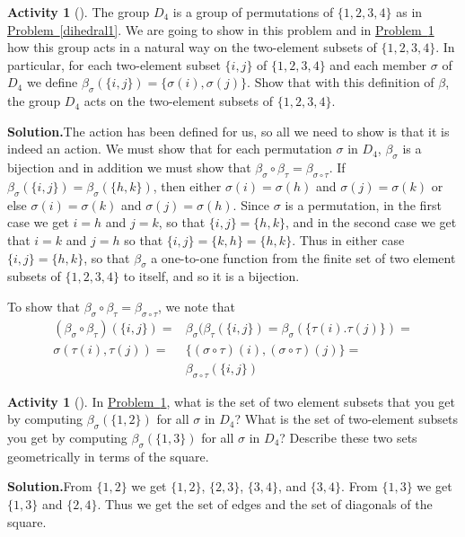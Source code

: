 \documentclass[10pt,]{book}
\theoremstyle{plain}
\theoremstyle{definition}
\newtheorem{activity}[project]{Activity}
\numberwithin{equation}{chapter}
\newcommand{\amp}{&}
\begin{document}
\begin{activity}[]\label{D_4on2-sets}
The group \(D_4\) is a group of permutations of \(\{1,2,3,4\}\) as in \hyperref[dihedral1]{Problem~\ref{dihedral1}}. We are going to show in this problem and in \hyperref[orbits1]{Problem~\ref{orbits1}} how this group acts in a natural way on the two-element subsets of \(\{1,2,3,4\}\). In particular, for each two-element subset \(\{i,j\}\) of \(\{1,2,3,4\}\) and each member \(\sigma\) of \(D_4\) we define \(\beta_{\sigma}(\{i,j\}) = \{\sigma(i),\sigma(j)\}\). Show that with this definition of \(\beta\), the group \(D_4\) acts on the two-element subsets of \(\{1,2,3,4\}\).%
\par\medskip\noindent%
\textbf{Solution.}\quad The action has been defined for us, so all we need to show is that it is indeed an action. We must show that for each permutation \(\sigma\) in \(D_4\), \(\beta_{\sigma}\) is a bijection and in addition we must show that \(\beta_{\sigma}\circ\beta_{\tau}=
\beta_{\sigma\circ\tau}\). If \(\beta_{\sigma}(\{i,j\})=\beta_{\sigma}(\{h,k\})\), then either \(\sigma(i)=\sigma(h)\) and \(\sigma(j)=\sigma(k)\) or else \(\sigma(i)=\sigma(k)\) and \(\sigma(j) =\sigma(h)\). Since \(\sigma\) is a permutation, in the first case we get \(i=h\) and \(j=k\), so that \(\{i,j\}=
\{h,k\}\), and in the second case we get that \(i=k\) and \(j=h\) so that \(\{i,j\} = \{k,h\} =\{h,k\}\). Thus in either case \(\{i,j\} = \{h,k\}\), so that \(\beta_{\sigma}\) a one-to-one function from the finite set of two element subsets of \(\{1,2,3,4\}\) to itself, and so it is a bijection.%
\par
To show that \(\beta_{\sigma}\circ\beta_{\tau} = \beta_{\sigma\circ\tau}\), we note that%
\begin{align*}
(\beta_{\sigma}\circ\beta_{\tau})(\{i,j\})  =\amp
\beta_{\sigma}(\beta_{\tau}(\{i,j\})=\beta_{\sigma}(\{\tau(i).
\tau(j)\})=\\
\sigma({\tau(i),\tau(j)}) =\amp \{(\sigma\circ\tau)(i),(\sigma\circ\tau)(j)\} =\\
\amp \beta_{\sigma\circ\tau}(\{i,j\})
\end{align*}
%
\end{activity}
\begin{activity}[]\label{orbits1}
In \hyperref[D_4on2-sets]{Problem~\ref{D_4on2-sets}}, what is the set of two element subsets that you get by computing \(\beta_{\sigma}(\{1,2\})\) for all \(\sigma\) in \(D_4\)? What is the set of two-element subsets you get by computing \(\beta_{\sigma}(\{1,3\})\) for all \(\sigma\) in \(D_4\)? Describe these two sets geometrically in terms of the square.%
\par\medskip\noindent%
\textbf{Solution.}\quad From \(\{1,2\}\) we get \(\{1,2\}\), \(\{2,3\}\), \(\{3,4\}\), and \(\{3,4\}\). From \(\{1,3\}\) we get \(\{1,3\}\) and \(\{2,4\}\). Thus we get the set of edges and the set of diagonals of the square.%
\end{activity}
\end{document}
